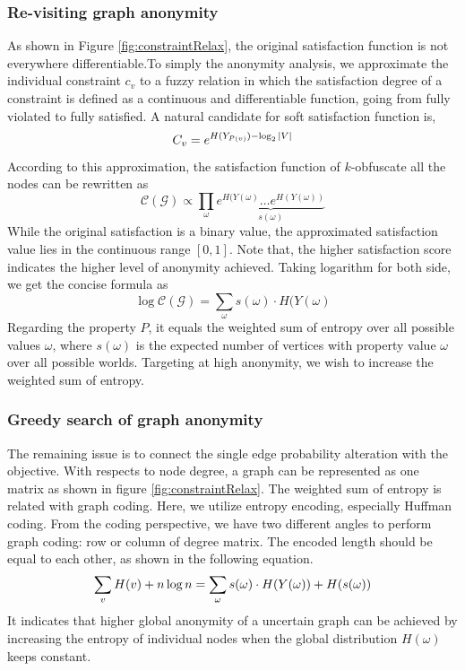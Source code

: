 \subsubsection{Re-visiting graph anonymity}
As shown in Figure \ref{fig:constraintRelax}, the original satisfaction function is not everywhere differentiable.To simply the anonymity analysis, we approximate the individual constraint $c_{v}$ to a fuzzy relation in which the satisfaction degree of a constraint is defined as a continuous and differentiable function, going from fully violated to fully satisfied. A natural candidate for soft satisfaction function is,
\svj  
\begin{equation*}
    C_{v} = e^{H(Y_{P(v)})-\log_{2}{|V|}}
    \svj
\end{equation*}
According to this approximation, the satisfaction function of $k$-obfuscate all the nodes can be rewritten as
\svj
\begin{equation*}
   \mathcal{C}(\mathcal{G}) \propto \prod_{\omega} \underbrace{e^{H(Y(\omega)} \ldots e^{H(Y(\omega))}}_{s(\omega)}
\end{equation*}
While the original satisfaction is a binary value, the approximated satisfaction value lies in the continuous range $[0,1]$. Note that, the higher satisfaction score indicates the higher level of anonymity achieved. Taking logarithm for both side, we get the concise formula as 
\svj
\begin{equation*}
    \log \mathcal{C}(\mathcal{G})=\sum_{\omega} s(\omega) \cdot H(Y(\omega)
\end{equation*}
Regarding the property $P$, it equals the weighted sum of entropy over all possible values $\omega$, where $s(\omega)$ is the expected number of vertices with property value $\omega$ over all possible worlds. Targeting at high anonymity, we wish to increase the weighted sum of entropy. 

\subsubsection{Greedy search of graph anonymity}
The remaining issue is to connect the single edge probability alteration with the objective. With respects to node degree, a graph can be represented as one matrix as shown in figure \ref{fig:constraintRelax}. The weighted sum of entropy is related with graph coding. Here, we utilize entropy encoding, especially Huffman coding. From the coding perspective, we have two different angles to perform graph coding: row or column of degree matrix. The encoded length should be equal to each other, as shown in the following equation.  
\svj
\begin{equation*}
    \sum_{v} H(v) + n \log{n} = \sum_{\omega} s(\omega) \cdot H(Y(\omega))+ H(s(\omega))
    \svj
    \label{wegithedEn}
\end{equation*}
It indicates that higher global anonymity of a uncertain graph can be achieved by increasing the entropy of individual nodes when the global distribution $H(\omega)$ keeps constant. 

